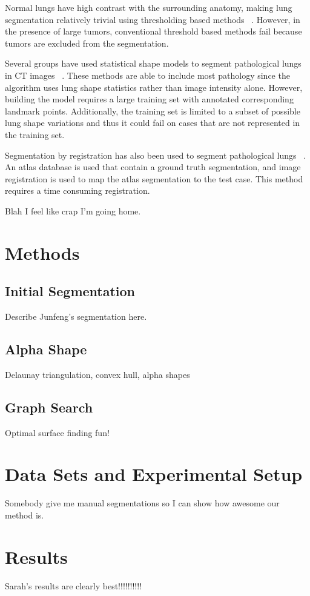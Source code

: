 \documentclass{llncs}
\begin{document}
Normal lungs have high contrast with the surrounding anatomy, making lung segmentation relatively trivial using thresholding based methods ~\cite{guo2008,hu2001}. However, in the presence of large tumors, conventional threshold based methods fail because tumors are excluded from the segmentation.

Several groups have used statistical shape models to segment pathological lungs in CT images ~\cite{sun2012,sofka2011}. These methods are able to include most pathology since the algorithm uses lung shape statistics rather than image intensity alone. However, building the model requires a large training set with annotated corresponding landmark points. Additionally, the training set is limited to a subset of possible lung shape variations and thus it could fail on cases that are not represented in the training set.

Segmentation by registration has also been used to segment pathological lungs ~\cite{sluimer2005,vanrikxoort2009}. An atlas database is used that contain a ground truth segmentation, and image registration is used to map the atlas segmentation to the test case. This method requires a time consuming registration.

Blah I feel like crap I'm going home.



%
\section{Methods}
%

%
\subsection{Initial Segmentation}
%
Describe Junfeng's segmentation here.
%
\subsection{Alpha Shape}
%
Delaunay triangulation, convex hull, alpha shapes
%
\subsection{Graph Search}
%
Optimal surface finding fun!
%
\section{Data Sets and Experimental Setup}
%
Somebody give me manual segmentations so I can show how awesome our method is.
%
\section{Results}
%
Sarah's results are clearly best!!!!!!!!!!
%
\end{document}
